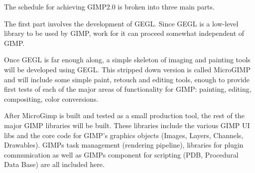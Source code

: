 
The schedule for achieving GIMP2.0 is broken into three main parts. 

The first part involves the development of GEGL. Since GEGL is a low-level
library to be used by GIMP, work for it can proceed somewhat independent of
GIMP.    

Once GEGL is far enough along, a simple skeleton of imaging and painting tools
will be developed using GEGL. This stripped down version is called MicroGIMP
and will include some simple paint, retouch and editing tools, enough to
provide first tests of each of the major areas of functionality for GIMP:
painting, editing, compositing, color conversions. 

After MicroGimp is built and tested as a small production tool, the rest of the
major GIMP libraries will be built. These libraries include the various GIMP UI
libs and the core code for GIMP's graphics objects (Images, Layers, Channels,
Drawables). GIMPs task management (rendering pipeline), libraries for plugin
communication  as well as GIMPs component for scripting (PDB, Procedural Data
Base) are all included here.  

